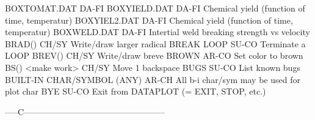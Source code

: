 BOXTOMAT.DAT                DA-FI 
BOXYIELD.DAT                DA-FI Chemical yield (function of time, temperatur)
BOXYIEL2.DAT                DA-FI Chemical yield (function of time, temperatur)
BOXWELD.DAT                 DA-FI Intertial weld breaking strength vs velocity
BRAD()                      CH/SY Write/draw larger radical
BREAK LOOP                  SU-CO Terminate a LOOP
BREV()                      CH/SY Write/draw breve
BROWN                       AR-CO Set color to brown
BS() <make work>            CH/SY Move 1 backspace
BUGS                        SU-CO List known bugs
BUILT-IN CHAR/SYMBOL (ANY)  AR-CH All b-i char/sym may be used for plot char
BYE                         SU-CO Exit from DATAPLOT (= EXIT, STOP, etc.)

-----C--------------------------------------------------

